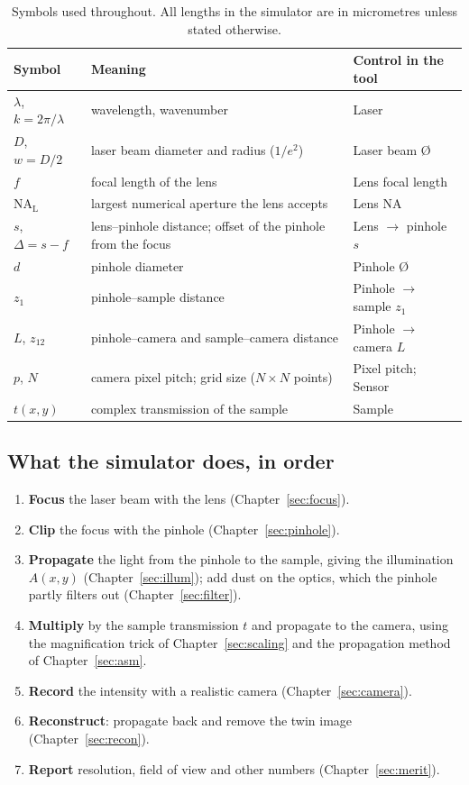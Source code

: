 \documentclass[12pt,a4paper]{article}
\begin{document}
\begin{table}[h]
\centering
\renewcommand{\arraystretch}{1.25}
\begin{tabular}{@{}l >{\raggedright\arraybackslash}p{6.2cm} >{\raggedright\arraybackslash}p{4.4cm}@{}}
\toprule
\textbf{Symbol} & \textbf{Meaning} & \textbf{Control in the tool}\\
\midrule
$\lambda$, $k=2\pi/\lambda$ & wavelength, wavenumber & Laser\\
$D$, $w=D/2$ & laser beam diameter and radius ($1/e^2$) & Laser beam Ø\\
$f$ & focal length of the lens & Lens focal length\\
$\mathrm{NA_L}$ & largest numerical aperture the lens accepts & Lens NA\\
$s$, $\Delta=s-f$ & lens--pinhole distance; offset of the pinhole from the focus & Lens $\to$ pinhole $s$\\
$d$ & pinhole diameter & Pinhole Ø\\
$z_1$ & pinhole--sample distance & Pinhole $\to$ sample $z_1$\\
$L$, $z_{12}$ & pinhole--camera and sample--camera distance & Pinhole $\to$ camera $L$\\
$p$, $N$ & camera pixel pitch; grid size ($N\times N$ points) & Pixel pitch; Sensor\\
$t(x,y)$ & complex transmission of the sample & Sample\\
\bottomrule
\end{tabular}
\caption{Symbols used throughout. All lengths in the simulator are in micrometres unless stated otherwise.}
\end{table}

\subsection*{What the simulator does, in order}
\begin{enumerate}[label=\textbf{\arabic*.}]
\item \textbf{Focus} the laser beam with the lens (Chapter~\ref{sec:focus}).
\item \textbf{Clip} the focus with the pinhole (Chapter~\ref{sec:pinhole}).
\item \textbf{Propagate} the light from the pinhole to the sample, giving the illumination $A(x,y)$ (Chapter~\ref{sec:illum}); add dust on the optics, which the pinhole partly filters out (Chapter~\ref{sec:filter}).
\item \textbf{Multiply} by the sample transmission $t$ and propagate to the camera, using the magnification trick of Chapter~\ref{sec:scaling} and the propagation method of Chapter~\ref{sec:asm}.
\item \textbf{Record} the intensity with a realistic camera (Chapter~\ref{sec:camera}).
\item \textbf{Reconstruct}: propagate back and remove the twin image (Chapter~\ref{sec:recon}).
\item \textbf{Report} resolution, field of view and other numbers (Chapter~\ref{sec:merit}).
\end{enumerate}
\end{document}
